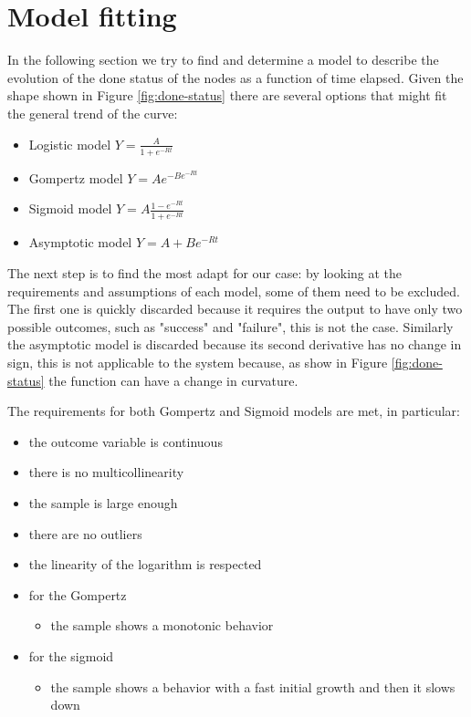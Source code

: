 \section{Model fitting} \label{sec:ModelFitting}
In the following section we try to find and determine a model to describe the evolution of the done status of the nodes as a function of time elapsed. Given the shape shown in Figure \ref{fig:done-status} there are several options that might fit the general trend of the curve:

\begin{itemize}
	\item Logistic model $ Y = \frac{A}{1 + e^{-Rt}} $
	\item Gompertz model $ Y = Ae^{-Be^{-Rt}} $
	\item Sigmoid model $ Y = A\frac{1-e^{-Rt}}{1+e^{-Rt}}$
	\item Asymptotic model $ Y = A + Be^{-Rt}$
\end{itemize} 

The next step is to find the most adapt for our case: by looking at the requirements and assumptions of each model, some of them need to be excluded. The first one is quickly discarded because it requires the output to have only two possible outcomes, such as "success" and "failure", this is not the case.
Similarly the asymptotic model is discarded because its second derivative has no change in sign, this is not applicable to the system because, as show in Figure \ref{fig:done-status} the function can have a change in curvature.


The requirements for both Gompertz and Sigmoid models are met, in particular:
\begin{itemize}
	\item the outcome variable is continuous
	\item there is no multicollinearity
	\item the sample is large enough
	\item there are no outliers
	\item the linearity of the logarithm is respected
	
	\item for the Gompertz
		\begin{itemize}
			\item the sample shows a monotonic behavior
		\end{itemize}
		\item for the sigmoid
		\begin{itemize}
			\item the sample shows a behavior with a fast initial growth and then it slows down
		\end{itemize}
\end{itemize}



